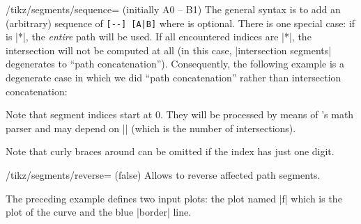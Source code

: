 {\begin{key}{/tikz/segments/sequence= (initially A0 -- B1)}
	The general syntax is to add an (arbitrary) sequence of \verb.[--] [A|B]. where  is optional. There is one special case: if  is |*|, the \emph{entire} path will be used. If all encountered indices are |*|, the intersection will not be computed at all (in this case, |intersection segments| degenerates to ``path concatenation''). Consequently, the following example is a degenerate case in which we did ``path concatenation'' rather than intersection concatenation:
\begin{codeexample}[]
\end{codeexample}

	Note that segment indices start at $0$. They will be processed by means of \pgfname's math parser and may depend on |\pgfintersectionsolutions| (which is the number of intersections).

	Note that curly braces around  can be omitted if the index has just one digit.
\end{key}

\begin{key}{/tikz/segments/reverse= (false)}
	Allows to reverse affected path segments.
\begin{codeexample}[]
\end{codeexample}
	The preceding example defines two input plots: the plot named |f| which is the plot of the curve and the blue |border| line.


\end{key}}
